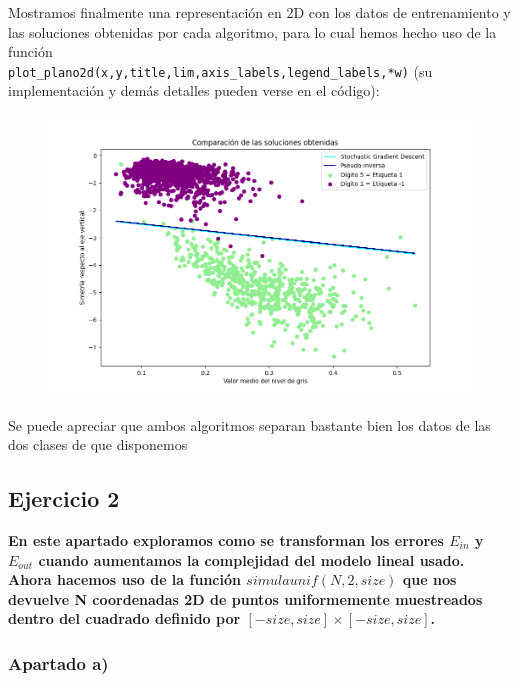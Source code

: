 \documentclass[a4]{article}
\begin{document}
Mostramos finalmente una representación en 2D con los datos de entrenamiento y las soluciones obtenidas por cada algoritmo, para lo cual hemos hecho uso de la función \\ \lstinline|plot_plano2d(x,y,title,lim,axis_labels,legend_labels,*w)| (su implementación y demás detalles pueden verse en el código):

\begin{figure}[H]
	\centering
	\includegraphics[width=1\linewidth]{img/comparacion}
	\caption{}
	\label{fig:comparacion}
\end{figure}
\vspace{-2mm}

Se puede apreciar que ambos algoritmos separan bastante bien los datos de las dos clases de que disponemos


\subsection{Ejercicio 2}

\textbf{En este apartado exploramos como se transforman los errores $E_{in}$ y $E_{out}$ cuando
aumentamos la complejidad del modelo lineal usado. Ahora hacemos uso de la función
$simula unif (N, 2, size)$ que nos devuelve N coordenadas 2D de puntos uniformemente
muestreados dentro del cuadrado definido por $[-size, size] \times [-size, size]$.}

\subsubsection{Apartado a)}
\end{document}
